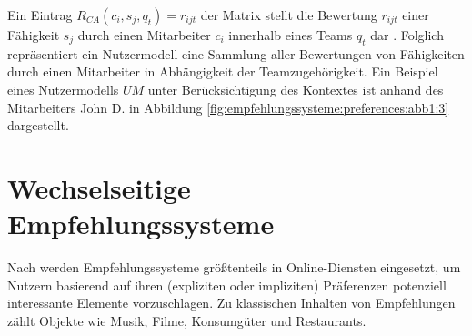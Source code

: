 Ein Eintrag $R_{CA}(c_{i},s_{j},q_{t}) = r_{ijt}$ der Matrix stellt die Bewertung $r_{ijt}$ einer Fähigkeit $s_{j}$ durch einen Mitarbeiter $c_{i}$ innerhalb eines Teams $q_{t}$ dar \cite[S. 198]{adomavicius:3:inbook}.
Folglich repräsentiert ein Nutzermodell eine Sammlung aller Bewertungen von Fähigkeiten durch einen Mitarbeiter in Abhängigkeit der Teamzugehörigkeit.
Ein Beispiel eines Nutzermodells $UM$ unter Berücksichtigung des Kontextes ist anhand des Mitarbeiters John D. in Abbildung \ref{fig:empfehlungssysteme:preferences:abb1:3} dargestellt.

\section{Wechselseitige Empfehlungssysteme}
\label{ch:empfehlungssysteme:rrs}
Nach \textcite[S. 2429]{palomares:inproceedings} werden Empfehlungssysteme größtenteils in Online-Diensten eingesetzt, um Nutzern basierend auf ihren (expliziten oder impliziten) Präferenzen potenziell interessante Elemente vorzuschlagen.
Zu klassischen Inhalten von Empfehlungen zählt \textcite[S. 2429]{palomares:inproceedings} Objekte wie Musik, Filme, Konsumgüter und Restaurants. 
 
